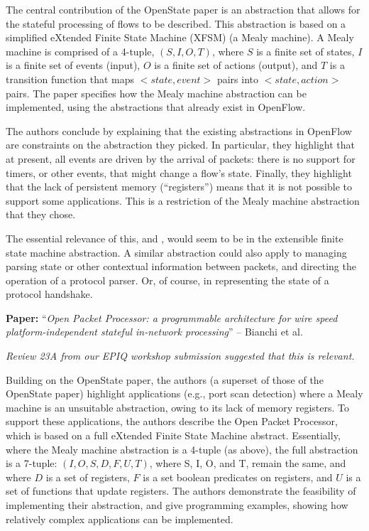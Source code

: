 \documentclass[10pt,a4paper]{article}
\newcommand{\paper}[3]{\vspace{4mm}\noindent\textbf{Paper:} ``\textit{#1}'' -- #2 \cite{#3}\vspace{3mm}}
\begin{document}
The central contribution of the OpenState paper is an abstraction
that allows for the stateful processing of flows to be described. This abstraction is
based on a simplified eXtended Finite State Machine (XFSM) (a Mealy machine). A Mealy
machine is comprised of a 4-tuple, $(S, I, O, T)$, where $S$ is a finite set of states,
$I$ is a finite set of events (input), $O$ is a finite set of actions (output), and
$T$ is a transition function that maps $<state, event>$ pairs into $<state, action>$
pairs. The paper specifies how the Mealy machine abstraction can be implemented, using the
abstractions that already exist in OpenFlow. 

The authors conclude by explaining that the existing abstractions in OpenFlow are
constraints on the abstraction they picked. In particular, they highlight that at present,
all events are driven by the arrival of packets: there is no support for timers, or other
events, that might change a flow's state. Finally, they highlight that the lack of
persistent memory (``registers'') means that it is not possible to support some 
applications. This is a restriction of the Mealy machine abstraction that they chose. 

The essential relevance of this, and \cite{bianchi:2016:open-packet}, would
seem to be in the extensible finite state machine abstraction. A similar
abstraction could also apply to managing parsing state or other contextual
information between packets, and directing the operation of a protocol parser. 
Or, of course, in representing the state of a protocol handshake.

\paper{Open Packet Processor: a programmable architecture for wire speed platform-independent
       stateful in-network processing}{Bianchi et al.}{bianchi:2016:open-packet}

\emph{Review 23A from our EPIQ workshop submission suggested that this is relevant.}

Building on the OpenState paper, the authors (a superset of those of the OpenState paper)
highlight applications (e.g., port scan detection) where a Mealy machine is an unsuitable
abstraction, owing to its lack of memory registers. To support these applications, the
authors describe the Open Packet Processor, which is based on a full eXtended Finite State
Machine abstract. Essentially, where the Mealy machine abstraction is a 4-tuple (as
above), the full abstraction is a 7-tuple: $(I, O, S, D, F, U, T)$, where S, I, O, and T,
remain the same, and where $D$ is a set of registers, $F$ is a set boolean predicates on
registers, and $U$ is a set of functions that update registers. The authors demonstrate
the feasibility of implementing their abstraction, and give programming examples, showing
how relatively complex applications can be implemented.
\end{document}
